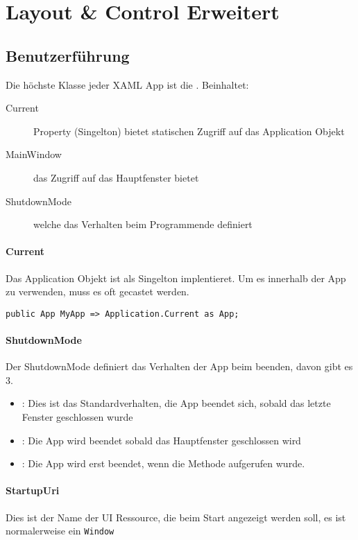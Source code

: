 \section{Layout & Control Erweitert}
\subsection{Benutzerführung}
Die höchste Klasse jeder XAML App ist die . Beinhaltet:
    \begin{description}
        \item[Current] Property (Singelton) bietet statischen Zugriff auf das Application Objekt
        \item[MainWindow] das Zugriff auf das Hauptfenster bietet
        \item[ShutdownMode] welche das Verhalten beim Programmende definiert
    \end{description}

\paragraph{Current} Das Application Objekt ist als Singelton implentieret. Um es innerhalb der App zu verwenden, muss es oft gecastet werden.
\begin{lstlisting}
public App MyApp => Application.Current as App;
\end{lstlisting}
\paragraph{ShutdownMode} Der ShutdownMode definiert das Verhalten der App beim beenden, davon gibt es 3.
\begin{itemize}
\item {}: Dies ist das Standardverhalten, die App beendet sich, sobald das letzte Fenster geschlossen wurde
\item {}: Die App wird beendet sobald das Hauptfenster geschlossen wird
\item {}: Die App wird erst beendet, wenn die  Methode aufgerufen wurde.
\end{itemize}
\paragraph{StartupUri} Dies ist der Name der UI Ressource, die beim Start angezeigt werden soll, es ist normalerweise ein \verb+Window+

